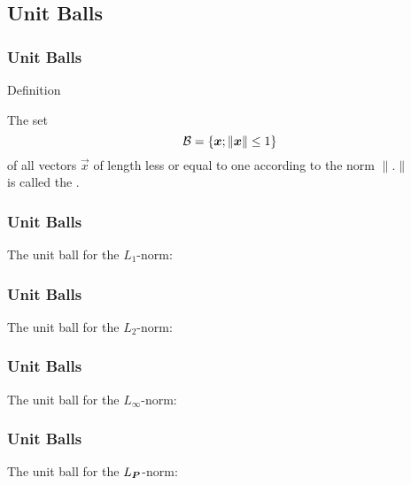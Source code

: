 \subsection{Unit Balls}

\begin{frame}
  \frametitle{Unit Balls}

  \begin{citeblock}{Definition}

    The set
    \begin{displaymath}
      {\cal B} = \{ \vec x; \|\vec x\| \leq 1\}
    \end{displaymath}
    of all vectors $\vec x$ of length less or equal to one according to the norm $\|.\|$ \\
    is called the .
  \end{citeblock}
\end{frame}


\begin{frame}
  \frametitle{Unit Balls \cont}
 
  The unit ball for the $L_1$-norm:

  \begin{figure}
    \resizebox{.4\linewidth}{!}{
      
    }
  \end{figure}
\end{frame}


\begin{frame}
  \frametitle{Unit Balls \cont}

  The unit ball for the $L_2$-norm:

  \begin{figure}
    \resizebox{.4\linewidth}{!}{
      
    }
  \end{figure}
\end{frame}


\begin{frame}
  \frametitle{Unit Balls \cont}

  The unit ball for the $L_{\infty}$-norm:

  \begin{figure}
    \resizebox{.4\linewidth}{!}{
      
    }
  \end{figure}
\end{frame}


\begin{frame}
  \frametitle{Unit Balls \cont}

  The unit ball for the $L_{\mat P}$-norm:
  \begin{figure}
    \resizebox{.4\linewidth}{!}{
      
    }
  \end{figure}
\end{frame}


